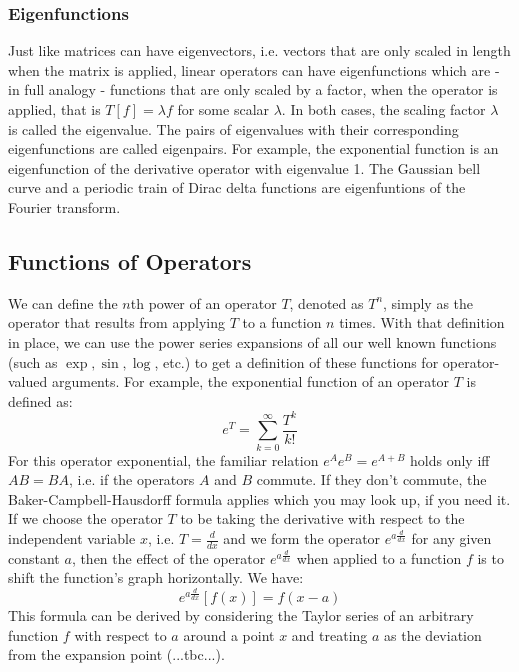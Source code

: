 % 


\subsubsection{Eigenfunctions}
Just like matrices can have eigenvectors, i.e. vectors that are only scaled in length when the matrix is applied, linear operators can have eigenfunctions which are - in full analogy - functions that are only scaled by a factor, when the operator is applied, that is $T[f] = \lambda f$ for some scalar $\lambda$. In both cases, the scaling factor $\lambda$ is called the eigenvalue. The pairs of eigenvalues with their corresponding eigenfunctions are called eigenpairs. For example, the exponential function is an eigenfunction of the derivative operator with eigenvalue 1. The Gaussian bell curve and a periodic train of Dirac delta functions are eigenfuntions of the Fourier transform.


\subsection{Functions of Operators}
We can define the $n$th power of an operator $T$, denoted as $T^n$, simply as the operator that results from applying $T$ to a function $n$ times. With that definition in place, we can use the power series expansions of all our well known functions (such as $\exp, \sin, \log$, etc.) to get a definition of these functions for operator-valued arguments. For example, the exponential function of an operator $T$ is defined as:
\begin{equation}
  e^T = \sum_{k=0}^{\infty} \frac{T^k}{k!}
\end{equation}
For this operator exponential, the familiar relation $e^A e^B = e^{A + B}$ holds only iff $A B = B A$, i.e. if the operators $A$ and $B$ commute. If they don't commute, the Baker-Campbell-Hausdorff formula applies which you may look up, if you need it. If we choose the operator $T$ to be taking the derivative with respect to the independent variable $x$, i.e. $T = \frac{d}{dx}$ and we form the operator $e^{a \frac{d}{dx}}$ for any given constant $a$, then the effect of the operator $e^{a \frac{d}{dx}}$ when applied to a function $f$ is to shift the function's graph horizontally. We have: 
\begin{equation}
  e^{a \frac{d}{dx}} [f(x)] = f(x-a)
\end{equation}
This formula can be derived by considering the Taylor series of an arbitrary function $f$ with respect to $a$ around a point $x$ and treating $a$ as the deviation from the expansion point (...tbc...).

